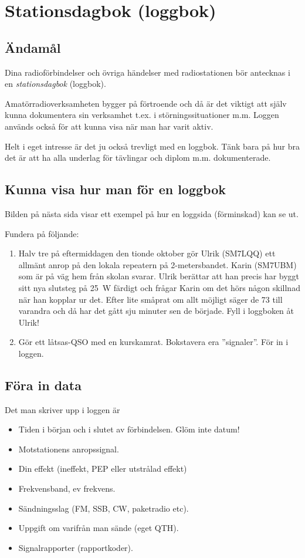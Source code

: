 \section{Stationsdagbok (loggbok)}

\subsection{Ändamål}

Dina radioförbindelser och övriga händelser med radiostationen bör
antecknas i en \emph{stationsdagbok} (loggbok).

Amatörradioverksamheten bygger på förtroende och då är det viktigt att
själv kunna dokumentera sin verksamhet t.ex. i störningssituationer
m.m. Loggen används också för att kunna visa när man har varit aktiv.

Helt i eget intresse är det ju också trevligt med en loggbok. Tänk
bara på hur bra det är att ha alla underlag för tävlingar och diplom
m.m. dokumenterade.

\subsection{Kunna visa hur man för en loggbok}

Bilden på nästa sida visar ett exempel på hur en loggsida (förminskad)
kan se ut.


Fundera på följande:
\begin{enumerate}
\item Halv tre på eftermiddagen den tionde oktober gör Ulrik (SM7LQQ)
  ett allmänt anrop på den lokala repeatern på 2-metersbandet.  Karin
  (SM7UBM) som är på väg hem från skolan svarar. Ulrik berättar att
  han precis har byggt sitt nya slutsteg på 25~W färdigt och frågar
  Karin om det hörs någon skillnad när han kopplar ur det. Efter lite
  småprat om allt möjligt säger de 73 till varandra och då har det
  gått sju minuter sen de började.  Fyll i loggboken åt Ulrik!
\item Gör ett låtsas-QSO med en kurskamrat. Bokstavera era
  ''signaler''. För in i loggen.
\end{enumerate}

\subsection{Föra in data}
Det man skriver upp i loggen är
\begin{itemize}
\item Tiden i början och i slutet av förbindelsen. Glöm inte datum!
\item Motstationens anropssignal.
\item Din effekt (ineffekt, PEP eller utstrålad effekt)
\item Frekvensband, ev frekvens.
\item Sändningsslag (FM, SSB, CW, paketradio etc).
\item Uppgift om varifrån man sände (eget QTH).
\item Signalrapporter (rapportkoder).
\end{itemize}

